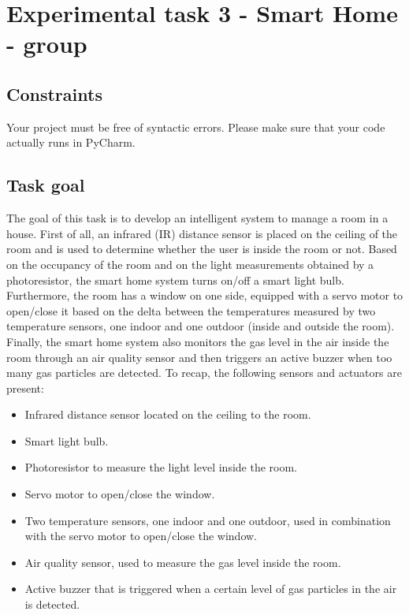 \chapter{Experimental task 3 - Smart Home - \tdd group}
\section{Constraints}
Your project must be free of syntactic errors. Please make sure that your code actually runs in PyCharm.

\section{Task goal}
The goal of this task is to develop an intelligent system to manage a room in a house. First of all, an infrared (IR) distance sensor is placed on the ceiling of the room and is used to determine whether the user is inside the room or not.
Based on the occupancy of the room and on the light measurements obtained by a photoresistor, the smart home system turns on/off a smart light bulb. 
Furthermore, the room has a window on one side, equipped with a servo motor to open/close it based on the delta between the temperatures measured by two temperature sensors, one indoor and one outdoor (\ie inside and outside the room).
Finally, the smart home system also monitors the gas level in the air inside the room through an air quality sensor and then triggers an active buzzer when too many gas particles are detected.
To recap, the following sensors and actuators are present:

\begin{itemize}
    \item Infrared distance sensor located on the ceiling to the room.
    \item Smart light bulb.
    \item Photoresistor to measure the light level inside the room.
    \item Servo motor to open/close the window.
    \item Two temperature sensors, one indoor and one outdoor, used in combination with the servo motor to open/close the window.
    \item Air quality sensor, used to measure the gas level inside the room.
    \item Active buzzer that is triggered when a certain level of gas particles in the air is detected.
\end{itemize}

